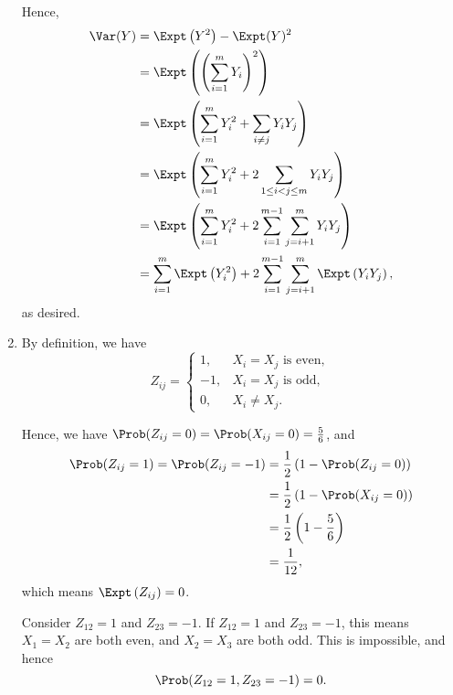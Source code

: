 \begin{enumerate}
          Hence,
          \begin{align*}
              \Var(Y) & = \Expt\left(Y^2\right) - \Expt(Y)^2                                                                                \\
                      & = \Expt \left(\left(\sum_{i = 1}^{m} Y_i\right)^2\right)                                                            \\
                      & = \Expt \left(\sum_{i = 1}^{m} Y_i^2 + \sum_{i \neq j} Y_i Y_j\right)                                               \\
                      & = \Expt \left(\sum_{i = 1}^{m} Y_i^2 + 2 \sum_{1 \leq i < j \leq m} Y_i Y_j\right)                                  \\
                      & = \Expt \left(\sum_{i = 1}^{m} Y_i^2 + 2 \sum_{i = 1}^{m - 1} \sum_{j = i + 1}^{m} Y_i Y_j\right)                   \\
                      & = \sum_{i = 1}^{m} \Expt\left(Y_i^2\right) + 2 \sum_{i = 1}^{m - 1} \sum_{j = i + 1}^{m} \Expt\left(Y_i Y_j\right),
          \end{align*}
          as desired.

    \item By definition, we have
          \[
              Z_{ij} = \begin{cases}
                  1,  & X_i = X_j \text{ is even}, \\
                  -1, & X_i = X_j \text{ is odd},  \\
                  0,  & X_i \neq X_j.
              \end{cases}
          \]

          Hence, we have \(\Prob(Z_{ij} = 0) = \Prob(X_{ij} = 0) = \frac{5}{6}\), and
          \begin{align*}
              \Prob(Z_{ij} = 1) = \Prob(Z_{ij} = -1) & = \frac{1}{2} \left(1 - \Prob(Z_{ij} = 0)\right) \\
                                                     & = \frac{1}{2} \left(1 - \Prob(X_{ij} = 0)\right) \\
                                                     & = \frac{1}{2} \left(1 - \frac{5}{6}\right)       \\
                                                     & = \frac{1}{12},
          \end{align*}
          which means \(\Expt\left(Z_{ij}\right) = 0\).

          Consider \(Z_{12} = 1\) and \(Z_{23} = -1\). If \(Z_{12} = 1\) and \(Z_{23} = -1\), this means \(X_1 = X_2\) are both even, and \(X_2 = X_3\) are both odd. This is impossible, and hence
          \[
              \Prob(Z_{12} = 1, Z_{23} = -1) = 0.
          \]


\end{enumerate}
